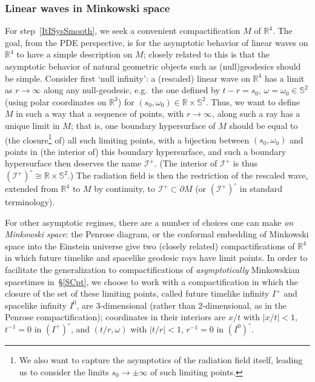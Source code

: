 \documentclass[reqno,11pt,letterpaper]{amsart}
\numberwithin{equation}{section}
\numberwithin{figure}{section}
\theoremstyle{definition}
\theoremstyle{remark}
\newcommand{\ms}{\mathscr}
\newcommand{\scri}{\ms I}
\newcommand{\R}{\mathbb{R}}
\newcommand{\Sph}{\mathbb{S}}
\newcommand{\pa}{\partial}
\begin{document}
\subsubsection{Linear waves in Minkowski space}
\label{SssISysLin}

For step~\ref{ItISysSmooth}, we seek a convenient compactification $M$ of $\R^4$. The goal, from the PDE perspective, is for the asymptotic behavior of linear waves on $\R^4$ to have a simple description on $M$; closely related to this is that the asymptotic behavior of natural geometric objects such as (null)geodesics should be simple. Consider first `null infinity': a (rescaled) linear wave on $\R^4$ has a limit as $r\to\infty$ along any null-geodesic, e.g.\ the one defined by $t-r=s_0$, $\omega=\omega_0\in\Sph^2$ (using polar coordinates on $\R^3$) for $(s_0,\omega_0)\in\R\times\Sph^2$. Thus, we want to define $M$ in such a way that a sequence of points, with $r\to\infty$, along such a ray has a unique limit in $M$; that is, one boundary hypersurface of $M$ should be equal to (the closure\footnote{We also want to capture the asymptotics of the radiation field itself, leading us to consider the limits $s_0\to\pm\infty$ of such limiting points.} of) all such limiting points, with a bijection between $(s_0,\omega_0)$ and points in (the interior of) this boundary hypersurface, and such a boundary hypersurface then deserves the name $\scri^+$. (The interior of $\scri^+$ is thus $(\scri^+)^\circ\cong\R\times\Sph^2$.) The radiation field is then the restriction of the rescaled wave, extended from $\R^4$ to $M$ by continuity, to $\scri^+\subset\pa M$ (or $(\scri^+)^\circ$ in standard terminology).

For other asymptotic regimes, there are a number of choices one can make \emph{on Minkowski space}: the Penrose diagram, or the conformal embedding of Minkowski space into the Einstein universe give two (closely related) compactifications of $\R^4$ in which future timelike and spacelike geodesic rays have limit points. In order to facilitate the generalization to compactifications of \emph{asymptotically} Minkowskian spacetimes in~\S\ref{SCpt}, we choose to work with a compactification in which the closure of the set of these limiting points, called future timelike infinity $I^+$ and spacelike infinity $I^0$, are 3-dimensional (rather than 2-dimensional, as in the Penrose compactification); coordinates in their interiors are $x/t$ with $|x/t|<1$, $t^{-1}=0$ in $(I^+)^\circ$, and $(t/r,\omega)$ with $|t/r|<1$, $r^{-1}=0$ in $(I^0)^\circ$.
\end{document}
